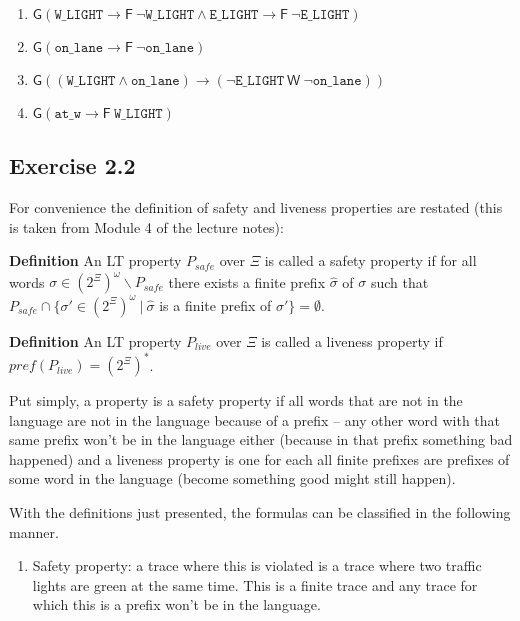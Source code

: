 \documentclass[12pt]{article}
\newcommand{\drafter}[1]{#1}
\begin{document}
\begin{enumerate}[label=\roman*.]
\begin{enumerate}[label=(\alph*)]
  \item $\mathsf{G}(\texttt{W\_LIGHT} \rightarrow \mathsf{F}~\neg\texttt{W\_LIGHT} \wedge \texttt{E\_LIGHT} \rightarrow \mathsf{F}~\neg\texttt{E\_LIGHT})$

  \item $\mathsf{G}(\texttt{on\_lane} \rightarrow \mathsf{F}~\neg\texttt{on\_lane})$

  \item $\mathsf{G}((\texttt{W\_LIGHT} \wedge \texttt{on\_lane}) \rightarrow (\neg\texttt{E\_LIGHT}~\mathsf{W}~\neg\texttt{on\_lane}))$

  \item $\mathsf{G}(\texttt{at\_w} \rightarrow \mathsf{F}~\texttt{W\_LIGHT})$
\end{enumerate}

\subsection*{Exercise 2.2}

\drafter{For convenience the definition of safety and liveness properties are restated (this is taken from Module 4 of the lecture notes):}

\drafter{\textbf{Definition} An LT property $P_{safe}$ over $\Xi$ is called a safety property if for all words $\sigma \in (2^\Xi)^\omega \backslash P_{safe}$ there exists a finite prefix $\hat{\sigma}$ of $\sigma$ such that $P_{safe} \cap \{\sigma' \in (2^\Xi)^\omega~|~\hat{\sigma}$ is a finite prefix of $\sigma' \} = \emptyset $}.

\drafter{\textbf{Definition} An LT property $P_{live}$ over $\Xi$ is called a liveness property if $pref(P_{live}) = (2^{\Xi})^*$}.

\drafter{Put simply, a property is a safety property if all words that are not in the language are not in the language because of a prefix -- any other word with that same prefix won't be in the language either (because in that prefix something bad happened) and a liveness property is one for each all finite prefixes are prefixes of some word in the language (become something good might still happen).}

\drafter{With the definitions just presented, the formulas can be classified in the following manner.}

\begin{enumerate}[label=(\alph*)]
  \item \drafter{Safety property: a trace where this is violated is a trace where two traffic lights are green at the same time. This is a finite trace and any trace for which this is a prefix won't be in the language.}


\end{enumerate}
\end{enumerate}
\end{document}
